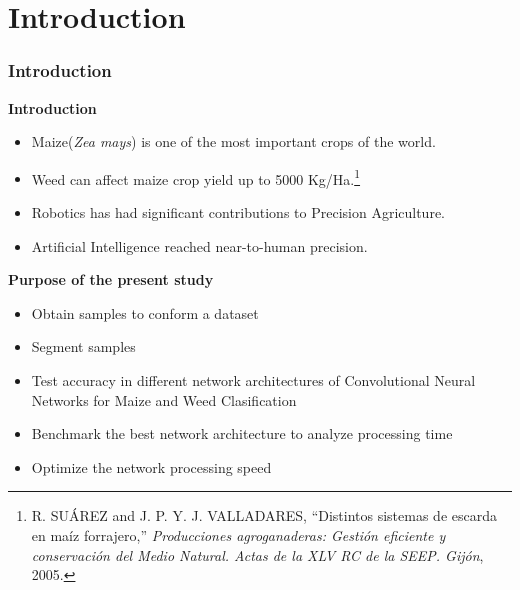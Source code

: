 \documentclass[10pt,a4paper]{beamer}
\begin{document}
\section{Introduction}
\begin{frame}
\frametitle{Introduction}
\textbf{Introduction}
\begin{itemize}
\item Maize(\textit{Zea mays}) is one of the most important crops of the world.
\item Weed can affect maize crop yield up to 5000 Kg/Ha.\footnote{ R. SU\'AREZ and J. P. Y. J. VALLADARES, “Distintos sistemas de escarda en ma\'iz forrajero,” \textit{Producciones agroganaderas: Gesti\'on eficiente
y conservaci\'on del Medio Natural. Actas de la XLV RC de la SEEP. Gij\'on}, 2005.} %
\item Robotics has had significant contributions to Precision Agriculture.%
\item Artificial Intelligence reached near-to-human precision.%
\end{itemize}
\textbf{Purpose of the present study}
\begin{itemize}
\item Obtain samples to conform a dataset%
\item Segment samples%
\item Test accuracy in different network architectures of Convolutional Neural Networks for Maize and Weed Clasification %
\item Benchmark the best network architecture to analyze processing time %
\item Optimize the network processing speed %
\end{itemize}
\end{frame}
\end{document}
